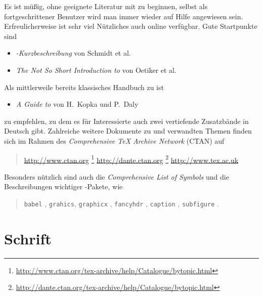 Es ist müßig, ohne geeignete Literatur mit \latex zu beginnen, selbst
als fortgeschrittener Benutzer wird man immer wieder auf Hilfe angewiesen
sein. Erfreulicherweise ist sehr viel Nützliches auch online verfügbar.
Gute Startpunkte sind \zB
%
\begin{itemize}
\item \emph{{\rm\LaTeXe}-Kurzbeschreibung} von Schmidt et al.\ \cite{Schmidt01}
\item \emph{The Not So Short Introduction to {\rm \LaTeXe}}
            von Oetiker et al.\ \cite{Oetiker01}
\end{itemize}
%
\noindent
Als mittlerweile bereits klassisches Handbuch zu \latex ist
%
\begin{itemize}
  \item \emph{A Guide to {\rm\LaTeXe}} von H.~Kopka und P.~Daly \cite{Kopka98}
\end{itemize}
%
zu empfehlen, zu dem es für Interessierte auch zwei vertiefende
Zusatzbände in Deutsch gibt. Zahlreiche weitere Dokumente zu
\latex und verwandten Themen finden sich \ua im Rahmen des {\em
Comprehensive TeX Archive Network} (CTAN) auf
\begin{quote}
	\url{http://www.ctan.org}%
	\footnote{\url{http://www.ctan.org/tex-archive/help/Catalogue/bytopic.html}}\newline
	\url{http://dante.ctan.org}%
	\footnote{\url{http://dante.ctan.org/tex-archive/help/Catalogue/bytopic.html}}\newline
	\url{http://www.tex.ac.uk}
\end{quote}
%
Besonders nützlich sind auch die
\emph{Comprehensive List of {\rm \latex} Symbols} \cite{Pakin01}
und die Beschreibungen wichtiger \latex-Pakete, wie
%
\begin{quote}
	\texttt{babel} \cite{Braams2008},\newline
  \texttt{grahics}, \texttt{graphicx} \cite{Carlisle99},\newline
  \texttt{fancyhdr} \cite{Oostrum97},\newline
  \texttt{caption} \cite{Sommerfeldt07},\newline
  \texttt{subfigure} \cite{Cochran95}.
\end{quote}





\section{Schrift}

